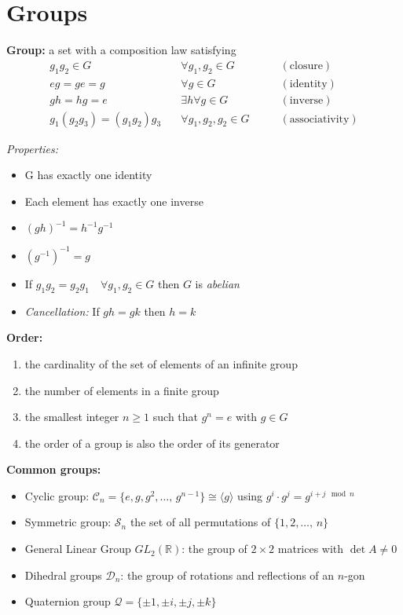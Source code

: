 \documentclass[12pt]{article}
\newcommand{\R}{\mathbb{R}}
\newcommand{\brak}[1]{\langle #1 \rangle}
\begin{document}
\section*{Groups}
\textbf{Group:} a set with a composition law satisfying
\begin{align*}
    g_1 g_2 \in G \quad &\forall g_1, g_2 \in G \qquad &(\text{closure})\\
    eg = ge = g \quad &\forall g\in G \qquad &(\text{identity})\\
    gh = hg = e \quad &\exists h \forall g \in G \qquad &(\text{inverse})\\ 
    g_1 (g_2g_3) = (g_1g_2)g_3 \quad &\forall g_1, g_2, g_2 \in G \qquad &(\text{associativity})
\end{align*}

\emph{Properties:}
\begin{itemize}
    \item G has exactly one identity
    \item Each element has exactly one inverse 
    \item $(gh)^{-1} = h^{-1} g^{-1}$
    \item $(g^{-1})^{-1} = g$
    \item If $g_1g_2 = g_2g_1 \quad \forall g_1, g_2 \in G$ then $G$ is \emph{abelian}
    \item \emph{Cancellation:} If $gh = gk$ then $h = k$
\end{itemize}

\textbf{Order:} 
\begin{enumerate}
    \item the cardinality of the set of elements of an infinite group 
    \item the number of elements in a finite group 
    \item the smallest integer $n \geq 1$ such that $g^n = e$ with $g \in G$
    \item the order of a group is also the order of its generator
\end{enumerate}

\textbf{Common groups:}
\begin{itemize}
    \item Cyclic group: $\mathcal{C}_n = \{e, g, g^2, \dots,\, g^{n-1}\} \cong \brak{g}$ using $g^{i} \cdot g^j = g^{i + j\mod n}$
    \item Symmetric group: $\mathcal{S}_n$ the set of all permutations of $\{1, 2, \dots,\, n\}$
    \item General Linear Group $GL_2(\R)$: the group of $2\times 2$ matrices with $\det A \neq 0$
    \item Dihedral groups $\mathcal{D}_n$: the group of rotations and reflections of an $n$-gon 
    \item Quaternion group $\mathcal Q = \{\pm 1, \pm i, \pm j, \pm k\}$
\end{itemize}
\end{document}
